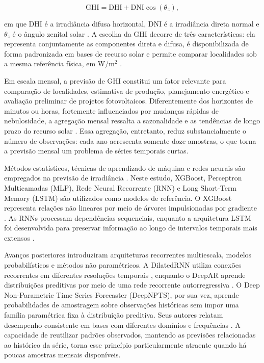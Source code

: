 \documentclass[11pt,a4paper]{article}
\begin{document}
\begin{equation}
\mathrm{GHI}=\mathrm{DHI}+\mathrm{DNI}\cos(\theta_z),
\label{eq:ghi}
\end{equation}

\noindent em que DHI é a irradiância difusa horizontal, DNI é a irradiância direta normal e $\theta_z$ é o ângulo zenital solar \cite{duffie2013}. A escolha da GHI decorre de três características: ela representa conjuntamente as componentes direta e difusa, é disponibilizada de forma padronizada em bases de recurso solar e permite comparar localidades sob a mesma referência física, em W/m$^2$ \cite{sengupta2018}.

Em escala mensal, a previsão de GHI constitui um fator relevante para comparação de localidades, estimativa de produção, planejamento energético e avaliação preliminar de projetos fotovoltaicos. Diferentemente dos horizontes de minutos ou horas, fortemente influenciados por mudanças rápidas de nebulosidade, a agregação mensal ressalta a sazonalidade e as tendências de longo prazo do recurso solar \cite{antonanzas2016,voyant2022}. Essa agregação, entretanto, reduz substancialmente o número de observações: cada ano acrescenta somente doze amostras, o que torna a previsão mensal um problema de séries temporais curtas.

Métodos estatísticos, técnicas de aprendizado de máquina e redes neurais são empregados na previsão de irradiância \cite{sobri2018}. Neste estudo, XGBoost, Perceptron Multicamadas (MLP), Rede Neural Recorrente (RNN) e Long Short-Term Memory (LSTM) são utilizados como modelos de referência. O XGBoost representa relações não lineares por meio de árvores impulsionadas por gradiente \cite{chen2016}. As RNNs processam dependências sequenciais, enquanto a arquitetura LSTM foi desenvolvida para preservar informação ao longo de intervalos temporais mais extensos \cite{hochreiter1997}.

Avanços posteriores introduziram arquiteturas recorrentes multiescala, modelos probabilísticos e métodos não paramétricos. A DilatedRNN utiliza conexões recorrentes em diferentes resoluções temporais \cite{chang2017}, enquanto o DeepAR aprende distribuições preditivas por meio de uma rede recorrente autorregressiva \cite{salinas2017}. O Deep Non-Parametric Time Series Forecaster (DeepNPTS), por sua vez, aprende probabilidades de amostragem sobre observações históricas sem impor uma família paramétrica fixa à distribuição preditiva. Seus autores relatam desempenho consistente em bases com diferentes domínios e frequências \cite{rangapuram2023}. A capacidade de reutilizar padrões observados, mantendo as previsões relacionadas ao histórico da série, torna esse princípio particularmente atraente quando há poucas amostras mensais disponíveis.
\end{document}

